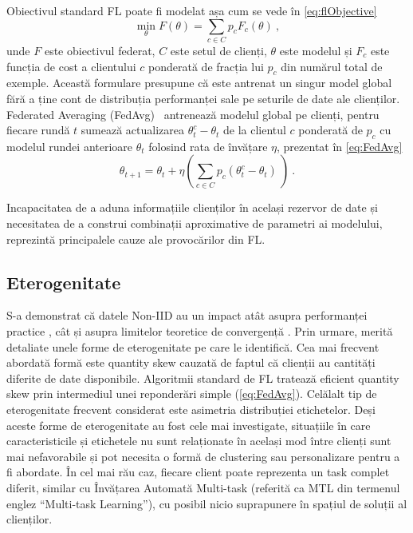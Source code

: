 
Obiectivul standard FL poate fi modelat așa cum se vede în \cref{eq:flObjective}
\begin{equation} \label{eq:flObjective}
    \underset{\theta}{\min} F(\theta) = \sum_{c \in C} p_c F_c(\theta) \ ,
\end{equation}
unde \(F\) este obiectivul federat, $C$ este setul de clienți, $\theta$ este modelul și \(F_c\) este funcția de cost a clientului \(c\) ponderată de fracția lui $p_c$ din numărul total de exemple. Această formulare presupune că este antrenat un singur model global fără a ține cont de distribuția performanței sale pe seturile de date ale clienților. Federated Averaging (FedAvg)~\citep{FedAvg} antrenează modelul global pe clienți, pentru fiecare rundă $t$ sumează actualizarea \(\theta_t^c - \theta_t\) de la clientul $c$ ponderată de \(p_c\) cu modelul rundei anterioare \(\theta_t\) folosind rata de învățare \( \eta \),  prezentat în \cref{eq:FedAvg}
\begin{equation} \label{eq:FedAvg}
    \theta_{t+1} = \theta_t + \eta \left( \sum_{c \in C} p_c \left(\theta_t^c - \theta_t \right) \ \right) \ .
\end{equation}

Incapacitatea de a aduna informațiile clienților în același rezervor de date și necesitatea de a construi combinații aproximative de parametri ai modelului, reprezintă principalele cauze ale provocărilor din FL.

\subsection{Eterogenitate}\label{background:data_heterogeneity}
S-a demonstrat că datele Non-IID au un impact atât asupra performanței practice \citep{FLwithNonIID}, cât și asupra limitelor teoretice de convergență \citep{OnTheConvergenceOfFedAvgOnNonIIDdata}. Prin urmare, merită detaliate unele forme de eterogenitate pe care \citet{AdvancedAndOpenProblems} le identifică. Cea mai frecvent abordată formă este quantity skew cauzată de faptul că clienții au cantități diferite de date disponibile. Algoritmii standard de FL tratează eficient quantity skew prin intermediul unei reponderări simple (\cref{eq:FedAvg}). Celălalt tip de eterogenitate frecvent considerat este asimetria distribuției etichetelor. Deși aceste forme de eterogenitate au fost cele mai investigate, situațiile în care caracteristicile și etichetele nu sunt relaționate în același mod între clienți sunt mai nefavorabile și pot necesita o formă de clustering sau personalizare pentru a  fi abordate. În cel mai rău caz, fiecare client poate reprezenta un task complet diferit, similar cu Învățarea Automată Multi-task (referită ca MTL din termenul englez ``Multi-task Learning''), cu posibil nicio suprapunere în spațiul de soluții al clienților.

